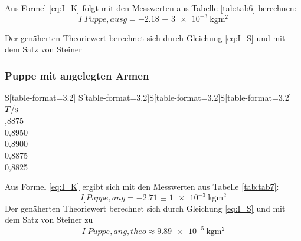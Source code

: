 Aus Formel \eqref{eq:I_K} folgt mit den Messwerten aus Tabelle \ref{tab:tab6}
berechnen:
\[I_.{Puppe,ausg}=\SI{-2,18(3)e-3}{\kilogram\metre\squared}\]

Der genäherten Theoriewert berechnet sich durch Gleichung \eqref{eq:I_S} und mit dem Satz von Steiner
\subsubsection{Puppe mit angelegten Armen}
\begin{table}
	\centering
	\caption{Messdaten zur Periodendauer einer Puppe mit angelegten Armen}
	\begin{tabular}{S[table-format=3.2] S[table-format=3.2]S[table-format=3.2]S[table-format=3.2]}
		\toprule
		{$T/\si[per-mode=reciprocal]{\second}$} \\
		,8875 \\
		 0,8950 \\
		 0,8900 \\
		 0,8875 \\
		 0,8825 \\
		\bottomrule
	\end{tabular}
	\label{tab:tab7}
\end{table}

Aus Formel \eqref{eq:I_K} ergibt sich mit den Messwerten aus Tabelle \ref{tab:tab7}:
\[I_.{Puppe,ang}=\SI{-2,71(1)e-3}{\kilogram\metre\squared}\]
Der genäherten Theoriewert berechnet sich durch Gleichung \eqref{eq:I_S} und mit dem Satz von Steiner zu
\[I_.{Puppe,ang,theo} \approx \SI{9,89e-5}{\kilogram\metre\squared} \]